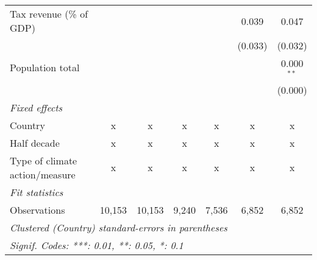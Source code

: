 \begin{tabular}{lcccccc}
   Tax revenue (\% of GDP)                                     &         &         &             &         & 0.039   & 0.047\\   
                                                               &         &         &             &         & (0.033) & (0.032)\\   
   Population total                                            &         &         &             &         &         & 0.000$^{**}$\\   
                                                               &         &         &             &         &         & (0.000)\\   
   \emph{Fixed effects}\\
   Country                                                     & x       & x       & x           & x       & x       & x\\  
   Half decade                                                 & x       & x       & x           & x       & x       & x\\  
   Type of climate action/measure                              & x       & x       & x           & x       & x       & x\\  
   \midrule \emph{Fit statistics}\\
   Observations                                                & 10,153  & 10,153  & 9,240       & 7,536   & 6,852   & 6,852\\  
   \midrule
   \multicolumn{7}{l}{\emph{Clustered (Country) standard-errors in parentheses}}\\
   \multicolumn{7}{l}{\emph{Signif. Codes: ***: 0.01, **: 0.05, *: 0.1}}\\
\end{tabular}
\par\endgroup


